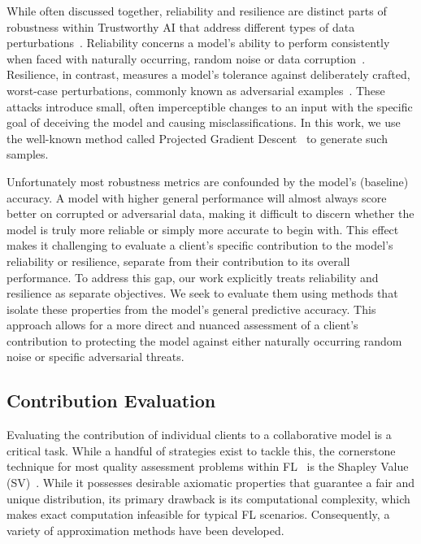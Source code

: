 \documentclass[sigconf]{acmart}
\begin{document}
While often discussed together, reliability and resilience are distinct parts of robustness within Trustworthy AI that address different types of data perturbations~\cite{fawzi2016robustness}. Reliability concerns a model's ability to perform consistently when faced with naturally occurring, random noise or data corruption~\cite{shannon1948}. Resilience, in contrast, measures a model's tolerance against deliberately crafted, worst-case perturbations, commonly known as adversarial examples~\cite{goodfellow2014explaining}. These attacks introduce small, often imperceptible changes to an input with the specific goal of deceiving the model and causing misclassifications. In this work, we use the well-known method called Projected Gradient Descent~\cite{madry2017towards} to generate such samples.

Unfortunately most robustness metrics are confounded by the model's (baseline) accuracy. A model with higher general performance will almost always score better on corrupted or adversarial data, making it difficult to discern whether the model is truly more reliable or simply more accurate to begin with. This effect makes it challenging to evaluate a client's specific contribution to the model's reliability or resilience, separate from their contribution to its overall performance. To address this gap, our work explicitly treats reliability and resilience as separate objectives. We seek to evaluate them using methods that isolate these properties from the model's general predictive accuracy. This approach allows for a more direct and nuanced assessment of a client's contribution to protecting the model against either naturally occurring random noise or specific adversarial threats.

\subsection{Contribution Evaluation}

Evaluating the contribution of individual clients to a collaborative model is a critical task. While a handful of strategies exist to tackle this, the cornerstone technique for most quality assessment problems within FL~\cite{jain2020overview} is the Shapley Value (SV)~\cite{winter2002shapley,rozemberczki2022shapley}. While it possesses desirable axiomatic properties that guarantee a fair and unique distribution, its primary drawback is its computational complexity, which makes exact computation infeasible for typical FL scenarios. Consequently, a variety of approximation methods have been developed.
\end{document}
